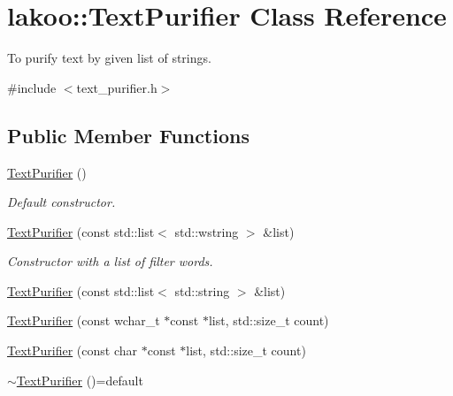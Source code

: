 \hypertarget{classlakoo_1_1_text_purifier}{}\section{lakoo\+:\+:Text\+Purifier Class Reference}
\label{classlakoo_1_1_text_purifier}


To purify text by given list of strings.  




{\ttfamily \#include $<$text\+\_\+purifier.\+h$>$}

\subsection*{Public Member Functions}
\begin{DoxyCompactItemize}
\item 
\mbox{\label{classlakoo_1_1_text_purifier_af8f553f1dca1ad70110dd14e872a783d}} 
\hyperlink{classlakoo_1_1_text_purifier_af8f553f1dca1ad70110dd14e872a783d}{Text\+Purifier} ()
\begin{DoxyCompactList}\small\item\em Default constructor. \end{DoxyCompactList}\item 
\hyperlink{classlakoo_1_1_text_purifier_aabaa9cc28934e9ef8a930d6e821efdf3}{Text\+Purifier} (const std\+::list$<$ std\+::wstring $>$ \&list)
\begin{DoxyCompactList}\small\item\em Constructor with a list of filter words. \end{DoxyCompactList}\item 
\hyperlink{classlakoo_1_1_text_purifier_aa0788313b1f9bcc6a96a0ccf09d8c839}{Text\+Purifier} (const std\+::list$<$ std\+::string $>$ \&list)
\item 
\hyperlink{classlakoo_1_1_text_purifier_a99488dd2cead65fb7d4f8de98ec41a27}{Text\+Purifier} (const wchar\+\_\+t $\ast$const $\ast$list, std\+::size\+\_\+t count)
\item 
\hyperlink{classlakoo_1_1_text_purifier_ab2e926137c1d58fe13803f6b871c9e55}{Text\+Purifier} (const char $\ast$const $\ast$list, std\+::size\+\_\+t count)
\item 
\mbox{\label{classlakoo_1_1_text_purifier_a765e379e07f7deb1a61c1b2f66b39610}} 
\hyperlink{classlakoo_1_1_text_purifier_a765e379e07f7deb1a61c1b2f66b39610}{$\sim$\+Text\+Purifier} ()=default

\end{DoxyCompactItemize}
